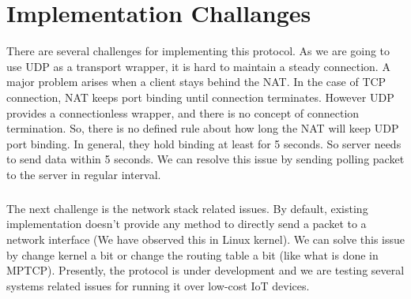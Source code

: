 \chapter{Implementation Challanges}
There are several challenges for implementing this protocol.
As we are going to use UDP as a transport wrapper, it
is hard to maintain a steady connection. A major problem
arises when a client stays behind the NAT. In the case of
TCP connection, NAT keeps port binding until connection
terminates. However UDP provides a connectionless wrapper,
and there is no concept of connection termination. So, there is
no defined rule about how long the NAT will keep UDP port
binding. In general, they hold binding at least for 5 seconds.
So server needs to send data within 5 seconds. We can resolve
this issue by sending polling packet to the server in regular
interval.

\paragraph{} The next challenge is the network stack related issues. By default, existing implementation doesn’t provide any method
to directly send a packet to a network interface (We have
observed this in Linux kernel). We can solve this issue by
change kernel a bit or change the routing table a bit (like
what is done in MPTCP). Presently, the protocol is under
development and we are testing several systems related issues
for running it over low-cost IoT devices.


